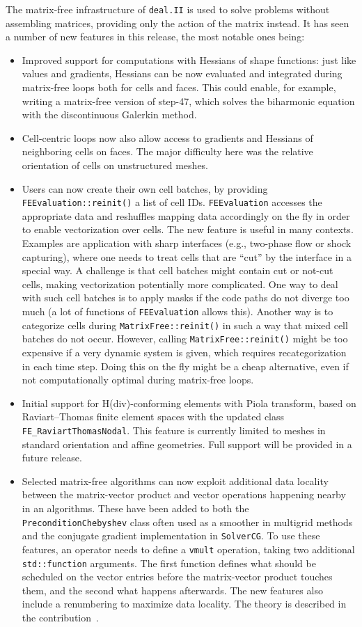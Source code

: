 \documentclass{ansarticle-preprint}
\newcommand{\specialword}[1]{\texttt{#1}}
\newcommand{\dealii}{{\specialword{deal.II}}\xspace}
\begin{document}
The matrix-free infrastructure of \dealii{} is used to solve problems
without assembling matrices, providing only the action of the matrix
instead. It has seen a number of new features in this release, the most
notable ones being:
\begin{itemize}
\item Improved support for computations with Hessians of shape functions: just like values and gradients, Hessians can be
now evaluated and integrated during matrix-free loops
both for cells and faces. This could enable, for example, writing
a matrix-free version of step-47, which solves the biharmonic equation with the discontinuous Galerkin method.
\item Cell-centric loops now also allow access to gradients and Hessians
of neighboring cells on faces. The major difficulty here was the relative orientation
of cells on unstructured meshes.
\item Users can now create their own cell batches, by providing \texttt{FEEvaluation::reinit()} a list of cell IDs. \texttt{FEEvaluation}
accesses the appropriate data and reshuffles mapping data accordingly on
the fly in order to enable vectorization over cells. The new feature is useful in many
contexts. Examples are application with sharp interfaces (e.g., two-phase flow
or shock capturing), where one needs to treat cells that are ``cut'' by
the interface in a special way. A challenge is that cell batches
might contain cut or not-cut cells, making vectorization potentially more complicated. One way to deal with such cell batches is to apply masks if
the code paths do not diverge too much
(a lot of functions of \texttt{FEEvaluation} allows this). Another way is to
categorize cells during \texttt{MatrixFree::reinit()} in such a way that mixed cell batches do not occur. However, calling  \texttt{MatrixFree::reinit()}
might be too expensive if a very dynamic system is given, which requires
recategorization in each time step. Doing this on the fly might be a cheap alternative, even if not computationally optimal during matrix-free loops.
\item Initial support for H(div)-conforming elements with Piola transform, based on Raviart--Thomas finite element spaces with the updated class \texttt{FE\_RaviartThomasNodal}. This feature is currently limited to meshes in standard orientation and affine geometries. Full support will be provided in a future release.
\item Selected matrix-free algorithms can now exploit additional data locality
  between the matrix-vector product and vector operations happening nearby in
  an algorithms. These have been added to both the
  \texttt{PreconditionChebyshev} class often used as a smoother in multigrid
  methods and the conjugate gradient implementation in \texttt{SolverCG}. To
  use these features, an operator needs to define a \texttt{vmult} operation,
  taking two additional \texttt{std::function} arguments. The first function
  defines what should be scheduled on the vector entries before the
  matrix-vector product touches them, and the second what happens
  afterwards. The new features also include a renumbering to maximize data
  locality. The theory is described in the
  contribution~\cite{kronbichler2022cg}.
\end{itemize}
\end{document}
